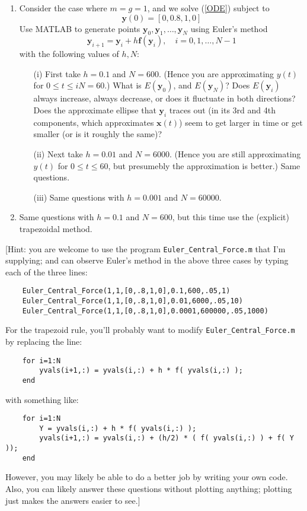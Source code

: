 \documentclass{article}
\begin{document}
\begin{enumerate}
	\item Consider the case where $m = g = 1$, and we solve (\ref{ODE}) subject to
		\begin{equation}
			\mathbf{y}(0) = [0,0.8,1,0]
		\end{equation}
		Use MATLAB to generate points $\mathbf{y}_0,\mathbf{y}_1,\dots,\mathbf{y}_N$
		using Euler's method
		\[
			\mathbf{y}_{i+1} = \mathbf{y}_i + h\mathbf{f}(\mathbf{y}_i),
			\quad i =0,1,\dots,N-1
		\]
		with the following values of $h,N$:
		\begin{enumerate}
			\item[(i)] First take $h = 0.1$ and $N = 600$.
				(Hence you are approximating $y(t)$ for $0 \leq t \leq iN = 60$.)
				What is $E(\mathbf{y}_0)$, and $E(\mathbf{y}_N)$?
				Does $E(\mathbf{y}_i)$ always increase, always decrease,
				or does it fluctuate in both directions?
				Does the approximate ellipse that $\mathbf{y}_i$ traces out
				(in its 3rd and 4th components, which approximates $\mathbf{x}(t)$)
				seem to get larger in time or get smaller (or is it roughly the same)?
			\item[(ii)] Next take $h = 0.01$ and $N = 6000$.
				(Hence you are still approximating $y(t)$ for $0 \leq t \leq 60$,
				but presumebly the approximation is better.) Same questions.
			\item[(iii)] Same questions with $h = 0.001$ and $N = 60000$.
		\end{enumerate}
	\item Same questions with $h = 0.1$ and $N = 600$,
		but this time use the (explicit) trapezoidal method.
\end{enumerate}
[Hint: you are welcome to use the program \verb|Euler_Central_Force.m|
that I'm supplying; and can observe Euler's method in the above three cases
by typing each of the three lines:
\begin{verbatim}
	Euler_Central_Force(1,1,[0,.8,1,0],0.1,600,.05,1)
	Euler_Central_Force(1,1,[0,.8,1,0],0.01,6000,.05,10)
	Euler_Central_Force(1,1,[0,.8,1,0],0.0001,600000,.05,1000)
\end{verbatim}
For the trapezoid rule, you'll probably want to modify
\verb|Euler_Central_Force.m| by replacing the line:
\begin{verbatim}
	for i=1:N
	    yvals(i+1,:) = yvals(i,:) + h * f( yvals(i,:) );
	end
\end{verbatim}
with something like:
\begin{verbatim}
	for i=1:N
	    Y = yvals(i,:) + h * f( yvals(i,:) );
	    yvals(i+1,:) = yvals(i,:) + (h/2) * ( f( yvals(i,:) ) + f( Y ));
	end
\end{verbatim}
However, you may likely be able to do a better job by writing your own code.
Also, you can likely answer these questions without plotting anything;
plotting just makes the answers easier to see.]
\end{document}
